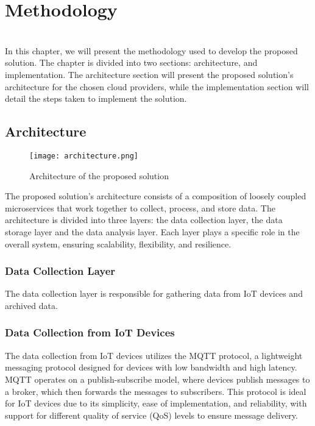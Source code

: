 \chapter{Methodology}
\label{cap:method}

\\

In this chapter, we will present the methodology used to develop the proposed solution. The chapter is divided into two sections: architecture, and implementation. The architecture section will present the proposed solution's architecture for the chosen cloud providers, while the implementation section will detail the steps taken to implement the solution.

\section{Architecture}

\begin{figure}[htbp]
    \centering
    \texttt{[image: architecture.png]}
    \caption{Architecture of the proposed solution}
\end{figure}

The proposed solution's architecture consists of a composition of loosely coupled microservices that work together to collect, process, and store data. The architecture is divided into three layers: the data collection layer, the data storage layer and the data analysis layer. Each layer plays a specific role in the overall system, ensuring scalability, flexibility, and resilience.

\subsection{Data Collection Layer}

The data collection layer is responsible for gathering data from IoT devices and archived data. 

\subsection{Data Collection from IoT Devices}

The data collection from IoT devices utilizes the MQTT protocol, a lightweight messaging protocol designed for devices with low bandwidth and high latency. MQTT operates on a publish-subscribe model, where devices publish messages to a broker, which then forwards the messages to subscribers. This protocol is ideal for IoT devices due to its simplicity, ease of implementation, and reliability, with support for different quality of service (QoS) levels to ensure message delivery.

